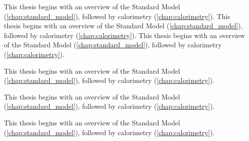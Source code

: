 This thesis begins with an overview of the Standard Model (\cref{chap:standard_model}), followed by calorimetry (\cref{chap:calorimetry}).
This thesis begins with an overview of the Standard Model (\cref{chap:standard_model}), followed by calorimetry (\cref{chap:calorimetry}).
This thesis begins with an overview of the Standard Model (\cref{chap:standard_model}), followed by calorimetry (\cref{chap:calorimetry}).
\begin{frame}[t]
This thesis begins with an overview of the Standard Model (\cref{chap:standard_model}), followed by calorimetry (\cref{chap:calorimetry}).
\end{frame}

\begin{frame}[t]
This thesis begins with an overview of the Standard Model (\cref{chap:standard_model}), followed by calorimetry (\cref{chap:calorimetry}).
\end{frame}

\begin{frame}[t]
This thesis begins with an overview of the Standard Model (\cref{chap:standard_model}), followed by calorimetry (\cref{chap:calorimetry}).
\end{frame}

